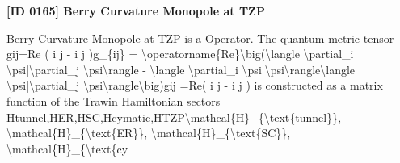 \clearpage
\noindent\textbf{[ID 0165] Berry Curvature Monopole at TZP}\par
\vspace{0.35em}
\begingroup\small
{}
Berry Curvature Monopole at TZP is a Operator. The quantum metric tensor gij=Re (  i   j  -  i        j  )g\_\{ij\} = \textbackslash{}operatorname\{Re\}\textbackslash{}big(\textbackslash{}langle \textbackslash{}partial\_i \textbackslash{}psi|\textbackslash{}partial\_j \textbackslash{}psi\textbackslash{}rangle - \textbackslash{}langle \textbackslash{}partial\_i \textbackslash{}psi|\textbackslash{}psi\textbackslash{}rangle\textbackslash{}langle \textbackslash{}psi|\textbackslash{}partial\_j \textbackslash{}psi\textbackslash{}rangle\textbackslash{}big)gij =Re(  i    j   -  i         j   ) is constructed as a matrix function of the Trawin Hamiltonian sectors Htunnel,HER,HSC,Hcymatic,HTZP\textbackslash{}mathcal\{H\}\_\{\textbackslash{}text\{tunnel\}\}, \textbackslash{}mathcal\{H\}\_\{\textbackslash{}text\{ER\}\}, \textbackslash{}mathcal\{H\}\_\{\textbackslash{}text\{SC\}\}, \textbackslash{}mathcal\{H\}\_\{\textbackslash{}text\{cy

